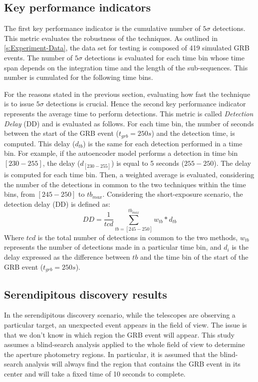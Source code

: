 \subsection{Key performance indicators}
The first key performance indicator is the cumulative number of $5\sigma$ detections. This metric evaluates the robustness of the techniques. As outlined in \autoref{s:Experiment-Data}, the data set for testing is composed of 419 simulated GRB events. The number of $5\sigma$ detections is evaluated for each time bin whose time span depends on the integration time and the length of the sub-sequences. This number is cumulated for the following time bins. 

For the reasons stated in the previous section, evaluating how fast the technique is to issue $5\sigma$ detections is crucial. Hence the second key performance indicator represents the average time to perform detections. This metric is called \textit{Detection Delay} (DD) and is evaluated as follows. For each time bin, the number of seconds between the start of the GRB event ($t_{grb}=250s$) and the detection time, is computed. This delay ($d_{tb}$) is the same for each detection performed in a time bin. For example, if the autoencoder model performs a detection in time bin $[230-255]$, the delay ($d_{[230-255]}$) is equal to 5 seconds ($255-250$). The delay is computed for each time bin. Then, a weighted average is evaluated, considering the number of the detections in common to the two techniques within the time bins, from $[245-250]$ to $tb_{max}$. Considering the short-exposure scenario, the detection delay (DD) is defined as:
$$
    DD = \frac{1}{tcd} \sum_{tb=[245-250]}^{tb_{max}} w_{tb}*d_{tb}
$$
Where $tcd$ is the total number of detections in common to the two methods, $w_{tb}$ represents the number of detections made in a particular time bin, and $d_i$ is the delay expressed as the difference between $tb$ and the time bin of the start of the GRB event ($t_{grb}=250s$). 

\FloatBarrier
\subsection{Serendipitous discovery results}
\label{s:Serendipitous-Discoveries-Results}
In the serendipitous discovery scenario, while the telescopes are observing a particular target, an unexpected event appears in the field of view. The issue is that we don't know in which region the GRB event will appear. This study assumes a blind-search analysis applied to the whole field of view to determine the aperture photometry regions. In particular, it is assumed that the blind-search analysis will always find the region that contains the GRB event in its center and will take a fixed time of 10 seconds to complete.

